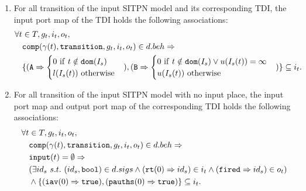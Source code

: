 \begin{definition}
\begin{enumerate}
  \item For all transition of the input SITPN model and its corresponding TDI, the input port map of the TDI holds the following associations:\\
    \begin{equation*}
      \begin{aligned}[t]
        \forall{}t&\in{}T,g_t,i_t,o_t, \\
                  & \mathtt{comp}(\gamma(t),\mathtt{transition},g_t,i_t,o_t)\in{}d.beh\Rightarrow \\
                  & \{(\mathtt{A}\Rightarrow\begin{cases}
                                              0~\mathrm{if}~t\notin\mathtt{dom}(I_s) \\
                                              l(I_s(t))~\mathrm{otherwise} \\
                                            \end{cases}),
        (\mathtt{B}\Rightarrow\begin{cases}
                                0~\mathrm{if}~t\notin\mathtt{dom}(I_s)\lor{}u(I_s(t))=\infty \\
                                u(I_s(t))~\mathrm{otherwise} \\
                              \end{cases})\}\subseteq{}i_t. \\
      \end{aligned}
    \end{equation*}
    
  \item For all transition of the input SITPN model with no input place, the input port map and output port map of the corresponding TDI holds the following associations:\\
    \begin{equation*}
      \begin{aligned}[t]
        \forall{}t&\in{}T,g_t,i_t,o_t, \\
                  & \mathtt{comp}(\gamma(t),\mathtt{transition},g_t,i_t,o_t)\in{}d.beh\Rightarrow \\
                  & \mathtt{input}(t)=\emptyset\Rightarrow \\
                  & (\exists{}id_s~s.t.~(id_s,\mathtt{bool})\in{}d.sigs\land(\mathtt{rt}(0)\Rightarrow{}id_s)\in{}i_t
                    \land(\mathtt{fired}\Rightarrow{}id_s)\in{}o_t)\\
                  & \land\{(\mathtt{iav}(0)\Rightarrow\mathtt{true}),
                    (\mathtt{pauths}(0)\Rightarrow\mathtt{true})\}\subseteq{}i_t. \\
      \end{aligned}
    \end{equation*}
    

\end{enumerate}
\end{definition}
